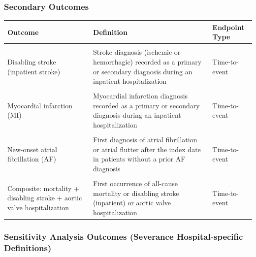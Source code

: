 \documentclass[
  12pt,
]{article}
\begin{document}
\subsubsection{Secondary Outcomes}\label{secondary-outcomes}

\begingroup\fontsize{8}{10}\selectfont

\begin{longtable}[t]{>{\raggedright\arraybackslash}p{10em}>{\raggedright\arraybackslash}p{25em}>{\raggedright\arraybackslash}p{7em}}
\toprule
Outcome & Definition & Endpoint Type\\
\midrule
\cellcolor{gray!10}{All-cause mortality} & \cellcolor{gray!10}{Death from any cause recorded in the OMOP CDM death domain} & \cellcolor{gray!10}{Time-to-event}\\
Disabling stroke (inpatient stroke) & Stroke diagnosis (ischemic or hemorrhagic) recorded as a primary or secondary diagnosis during an inpatient hospitalization & Time-to-event\\
\cellcolor{gray!10}{All stroke} & \cellcolor{gray!10}{Any stroke diagnosis (ischemic or hemorrhagic) recorded in inpatient or outpatient settings} & \cellcolor{gray!10}{Time-to-event}\\
Myocardial infarction (MI) & Myocardial infarction diagnosis recorded as a primary or secondary diagnosis during an inpatient hospitalization & Time-to-event\\
\cellcolor{gray!10}{New permanent pacemaker insertion (New PPI)} & \cellcolor{gray!10}{First occurrence of a permanent pacemaker implantation procedure after the index date in patients without a prior pacemaker} & \cellcolor{gray!10}{Time-to-event}\\
\addlinespace
New-onset atrial fibrillation (AF) & First diagnosis of atrial fibrillation or atrial flutter after the index date in patients without a prior AF diagnosis & Time-to-event\\
\cellcolor{gray!10}{Aortic valve hospitalization} & \cellcolor{gray!10}{Inpatient hospitalization with a primary diagnosis related to structural aortic valve disease or valve failure} & \cellcolor{gray!10}{Time-to-event}\\
Composite: mortality + disabling stroke + aortic valve hospitalization & First occurrence of all-cause mortality or disabling stroke (inpatient) or aortic valve hospitalization & Time-to-event\\
\bottomrule
\end{longtable}
\endgroup{}

\subsubsection{Sensitivity Analysis Outcomes (Severance
Hospital-specific
Definitions)}\label{sensitivity-analysis-outcomes-severance-hospital-specific-definitions}
\end{document}
